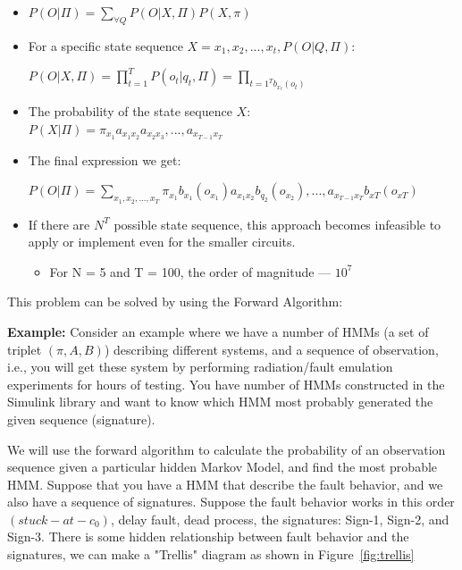 \begin{itemize}

\item  $P(O | \Pi) = \sum\limits_{\forall Q}^{} P (O | X, \Pi) P (X, \pi)$ 

\item For a specific state sequence $X = {x_1, x_2,...,x_t}, P(O | Q, \Pi):$

 \hspace {0.2cm} $P (O | X, \Pi) = \prod_{t=1}^{T} P (o_t | q_t, \Pi) = \prod_{t=1^{T} b_{x_t} (o_t)}$
 
 \item The probability of the state sequence $X$:
 \\
 \hspace {0.2cm} $ P (X | \Pi ) = \pi_{x_1} a_{x_1 x_2} a_{x_2 x_3},...,a_{x_{T-1} x_T}$
 
 \item The final expression we get:
 


$P (O | \Pi ) = \sum\limits_{x_1, x_2,..., x_T} \pi_{x_1} b_{x_1} (o_{x_1}) a_{x_1 x_2} b_{q_2} (o_{x_2}),..., a_{x_{T-1} x_T} b_{xT} (o_{xT})$

\item If there are $N^T$ possible state sequence, this approach becomes infeasible to apply or implement even for the smaller circuits.

\begin{itemize}
\item For N = 5 and T = 100, the order of magnitude --- $10^7$
\end{itemize}
 

\end{itemize}

This problem can be solved by using the Forward Algorithm:

\textbf{Example:} Consider an example where we have a number of HMMs (a set of triplet $(\pi, A, B)$) describing different systems, and a sequence of observation, i.e., you will get these system by performing radiation/fault emulation experiments for hours of testing. You have number of HMMs constructed in the Simulink library and want to know which HMM most probably generated the given sequence (signature).


We will use the forward algorithm to calculate the probability of an observation sequence given a particular hidden Markov Model, and find the most probable HMM. Suppose that you have a HMM that describe the fault behavior, and we also have a sequence of signatures. Suppose the fault behavior works in this order $(stuck-at-c_0)$, delay fault, dead process, the signatures: Sign-1, Sign-2, and Sign-3. There is some hidden relationship between fault behavior and the signatures, we can make a "Trellis" diagram as shown in Figure~\ref{fig:trellis}



